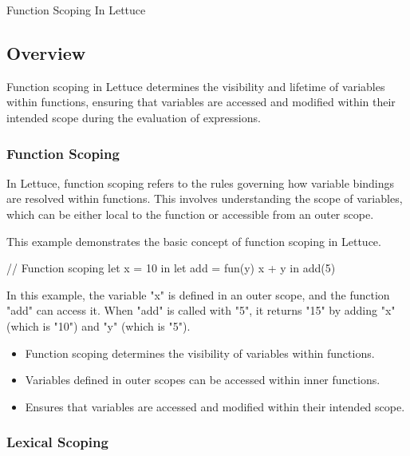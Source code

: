 \begin{notes}{Function Scoping In Lettuce}
    \subsection*{Overview}

    Function scoping in Lettuce determines the visibility and lifetime of variables within functions, ensuring that variables are accessed and modified within their intended scope during the evaluation of expressions.
    
    \subsubsection*{Function Scoping}
    
    In Lettuce, function scoping refers to the rules governing how variable bindings are resolved within functions. This involves understanding the scope of variables, which can be either local to the 
    function or accessible from an outer scope.
    
    \begin{highlight}
    
        This example demonstrates the basic concept of function scoping in Lettuce.
    
    \begin{code}[Lettuce]
    // Function scoping
    let x = 10 in
    let add = fun(y) {
        x + y
    } in
    add(5)
    \end{code}
    
        In this example, the variable "x" is defined in an outer scope, and the function "add" can access it. When "add" is called with "5", it returns "15" by adding "x" (which is "10") and "y" (which is "5").
    
        \begin{itemize}
            \item Function scoping determines the visibility of variables within functions.
            \item Variables defined in outer scopes can be accessed within inner functions.
            \item Ensures that variables are accessed and modified within their intended scope.
        \end{itemize}
    
    \end{highlight}
    
    \subsubsection*{Lexical Scoping}
    

\end{notes}
